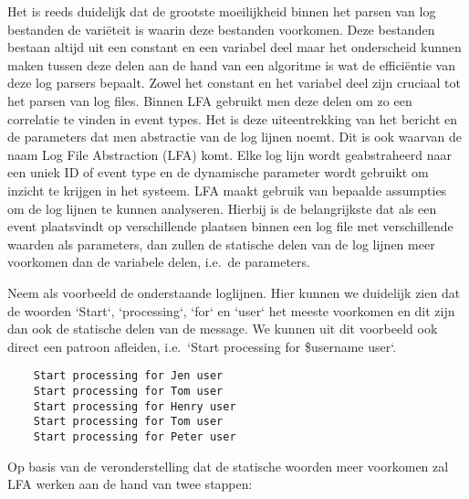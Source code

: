 Het is reeds duidelijk dat de grootste moeilijkheid binnen het parsen van log bestanden de variëteit is waarin deze bestanden voorkomen. Deze bestanden bestaan altijd uit een constant en een variabel deel maar het onderscheid kunnen maken tussen deze delen aan de hand van een algoritme is wat de efficiëntie van deze log parsers bepaalt. Zowel het constant en het variabel deel zijn cruciaal tot het parsen van log files. Binnen LFA gebruikt men deze delen om zo een correlatie te vinden in event types. Het is deze uiteentrekking van het bericht en de parameters dat men abstractie van de log lijnen noemt. Dit is ook waarvan de naam Log File Abstraction (LFA) komt. Elke log lijn wordt geabstraheerd naar een uniek ID of event type en de dynamische parameter wordt gebruikt om inzicht te krijgen in het systeem. LFA maakt gebruik van bepaalde assumpties om de log lijnen te kunnen analyseren. Hierbij is de belangrijkste dat als een event plaatsvindt op verschillende plaatsen binnen een log file met verschillende waarden als parameters, dan zullen de statische delen van de log lijnen meer voorkomen dan de variabele delen, i.e.\ de parameters.

Neem als voorbeeld de onderstaande loglijnen. Hier kunnen we duidelijk zien dat de woorden `Start`, `processing`, `for` en `user` het meeste voorkomen en dit zijn dan ook de statische delen van de message. We kunnen uit dit voorbeeld ook direct een patroon afleiden, i.e.\ `Start processing for \$username user`.\\
\begin{verbatim}
    Start processing for Jen user
    Start processing for Tom user
    Start processing for Henry user
    Start processing for Tom user
    Start processing for Peter user
\end{verbatim}

Op basis van de veronderstelling dat de statische woorden meer voorkomen zal LFA werken aan de hand van twee stappen:

